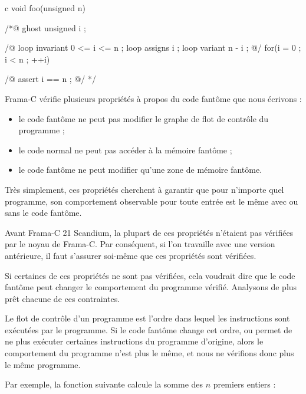 \begin{CodeBlock}{c}
void foo(unsigned n){
 /*@ ghost
   unsigned i ;

   /@
     loop invariant 0 <= i <= n ;
     loop assigns i ;
     loop variant n - i ;
   @/
   for(i = 0 ; i < n ; ++i){

   }
   /@ assert i == n ; @/
 */
}
\end{CodeBlock}




Frama-C vérifie plusieurs propriétés à propos du code fantôme que nous écrivons :


\begin{itemize}
\item le code fantôme ne peut pas modifier le graphe de flot de contrôle
      du programme ;
\item le code normal ne peut pas accéder à la mémoire fantôme ;
\item le code fantôme ne peut modifier qu'une zone de mémoire fantôme.
\end{itemize}


Très simplement, ces propriétés cherchent à garantir que pour n'importe
quel programme, son comportement observable pour toute entrée est le même
avec ou sans le code fantôme.


\begin{Warning}
  Avant Frama-C 21 Scandium, la plupart de ces propriétés n'étaient pas vérifiées
  par le noyau de Frama-C. Par conséquent, si l'on travaille avec une version
  antérieure, il faut s'assurer soi-même que ces propriétés sont vérifiées.
\end{Warning}


Si certaines de ces propriétés ne sont pas vérifiées, cela voudrait dire que le
code fantôme peut changer le comportement du programme vérifié. Analysons de plus
prêt chacune de ces contraintes.




Le flot de contrôle d'un programme est l'ordre dans lequel les instructions sont
exécutées par le programme. Si le code fantôme change cet ordre, ou permet de ne
plus exécuter certaines instructions du programme d'origine, alors le comportement
du programme n'est plus le même, et nous ne vérifions donc plus le même programme.


Par exemple, la fonction suivante calcule la somme des $n$ premiers entiers :


